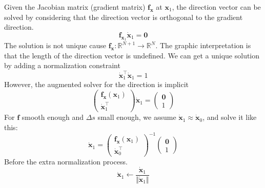 \documentclass[10pt,letterpaper]{article}
\begin{document}
Given the Jacobian matrix (gradient matrix) $\mathbf f_{\mathbf x}$ at $\mathbf x_1$, the direction vector can be solved by considering that the direction vector is orthogonal to the gradient direction. 
\begin{equation}
\mathbf f_{\mathbf x_1} \dot{\mathbf x}_1 = \mathbf 0
\end{equation}
The solution is not unique cause $\mathbf f_{\mathbf x} : \mathbb R^{N+1} \rightarrow \mathbb R^N$. The graphic interpretation is that the length of the direction vector is undefined. We can get a unique solution by adding a normalization constraint
\begin{equation}
\dot{\mathbf x}_1^\top \dot{\mathbf x}_1 = 1
\end{equation}
However, the augmented solver for the direction is implicit
\begin{equation}
\begin{pmatrix}
\mathbf f_{\mathbf x} (\mathbf x_1)
\\\dot{\mathbf x}_1^\top 
\end{pmatrix}
\dot{\mathbf x}_1 = 
\begin{pmatrix}
\mathbf 0
\\1
\end{pmatrix}
\end{equation}
For $\mathbf f$ smooth enough and $\Delta s$ small enough, we assume $\dot{\mathbf x}_1 \approx \dot{\mathbf x}_0$, and solve it like this: 
\begin{equation}
\dot{\mathbf x}_1 = 
\begin{pmatrix}
\mathbf f_{\mathbf x} (\mathbf x_1)
\\\dot{\mathbf x}_0^\top 
\end{pmatrix}^{-1}
\begin{pmatrix}
\mathbf 0
\\1
\end{pmatrix}
\end{equation}
Before the extra normalization process.
\begin{equation}
\dot{\mathbf x}_1 
\leftarrow 
\frac{\dot{\mathbf x}_1 }{\Vert \dot{\mathbf x}_1 \Vert}
\end{equation}
\end{document}
